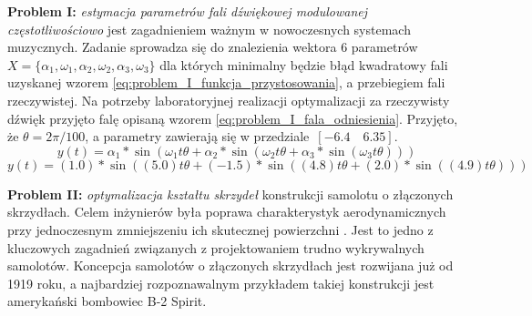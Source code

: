 \par
\textbf{Problem I:} \emph{estymacja parametrów fali dźwiękowej modulowanej częstotliwościowo} jest zagadnieniem ważnym w nowoczesnych systemach muzycznych. Zadanie sprowadza się do znalezienia wektora 6 parametrów $X = \lbrace\alpha_1, \omega_1, \alpha_2, \omega_2, \alpha_3, \omega_3\rbrace$ dla których minimalny będzie błąd kwadratowy fali uzyskanej wzorem \ref{eq:problem_I_funkcja_przystosowania}, a przebiegiem fali rzeczywistej. Na potrzeby laboratoryjnej realizacji optymalizacji za rzeczywisty dźwięk przyjęto falę opisaną wzorem \ref{eq:problem_I_fala_odniesienia}. Przyjęto, że $\theta = 2\pi/100$, a parametry zawierają się w przedziale~$[-6.4\quad6.35]$.
\begin{equation} \label{eq:problem_I_funkcja_przystosowania}
y(t)=\alpha_1*\sin(\omega_1 t\theta + \alpha_2*\sin(\omega_2 t\theta + \alpha_3*\sin(\omega_3 t\theta)))
\end{equation}
\begin{equation} \label{eq:problem_I_fala_odniesienia}
y(t)=(1.0)*\sin((5.0) t\theta + (-1.5)*\sin((4.8) t\theta + (2.0)*\sin((4.9) t\theta)))
\end{equation}
\par
\textbf{Problem II:} \emph{optymalizacja kształtu skrzydeł} konstrukcji samolotu o złączonych skrzydłach. Celem inżynierów była poprawa charakterystyk aerodynamicznych przy jednoczesnym zmniejszeniu ich skutecznej powierzchni \cite{lee2007multi}. Jest to jedno z kluczowych zagadnień związanych z projektowaniem trudno wykrywalnych samolotów. Koncepcja samolotów o złączonych skrzydłach jest rozwijana już od 1919 roku, a najbardziej rozpoznawalnym przykładem takiej konstrukcji jest amerykański bombowiec B-2 Spirit. 

